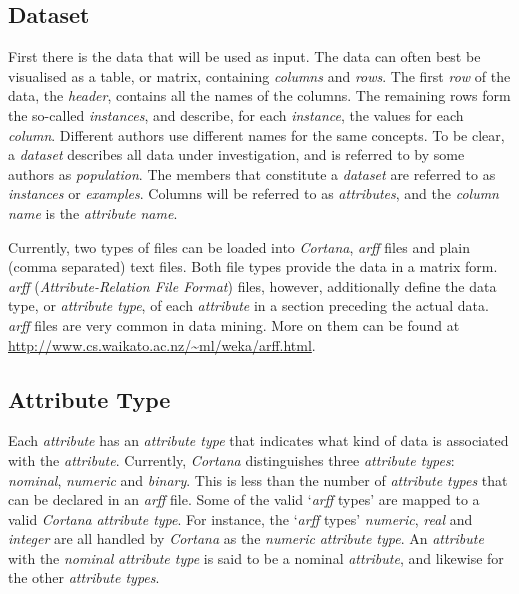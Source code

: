 \documentclass{article}
\begin{document}
\subsection{Dataset}
\label{preliminaries:dataset}
First there is the data that will be used as input.
The data can often best be visualised as a table, or matrix, containing \emph{columns} and \emph{rows}.
The first \emph{row} of the data, the \emph{header}, contains all the names of the columns.
The remaining rows form the so-called \emph{instances}, and describe, for each \emph{instance}, the values for each \emph{column}.
Different authors use different names for the same concepts.
To be clear, a \emph{dataset} describes all data under investigation, and is referred to by some authors as \emph{population}.
The members that constitute a \emph{dataset} are referred to as \emph{instances} or \emph{examples}.
Columns will be referred to as \emph{attributes}, and the \emph{column name} is the \emph{attribute name}.

Currently, two types of files can be loaded into \emph{Cortana}, \emph{arff} files and plain (comma separated) text files.
Both file types provide the data in a matrix form.
\emph{arff} (\emph{Attribute-Relation File Format}) files, however, additionally define the data type, or \emph{attribute type}, of each \emph{attribute} in a section preceding the actual data.
\emph{arff} files are very common in data mining. More on them can be found at \url{http://www.cs.waikato.ac.nz/~ml/weka/arff.html}.



\subsection{Attribute Type}
\label{preliminaries:attribute-type}
Each \emph{attribute} has an \emph{attribute type} that indicates what kind of data is associated with the \emph{attribute}.
Currently, \emph{Cortana} distinguishes three \emph{attribute types}: \emph{nominal}, \emph{numeric} and \emph{binary}.
This is less than the number of \emph{attribute types} that can be declared in an \emph{arff} file.
Some of the valid `\emph{arff} types' are mapped to a valid \emph{Cortana} \emph{attribute type}.
For instance, the `\emph{arff} types' \emph{numeric}, \emph{real} and \emph{integer} are all handled by \emph{Cortana} as the \emph{numeric} \emph{attribute type}.
An \emph{attribute} with the \emph{nominal} \emph{attribute type} is said to be a nominal \emph{attribute}, and likewise for the other \emph{attribute types}.
\end{document}
